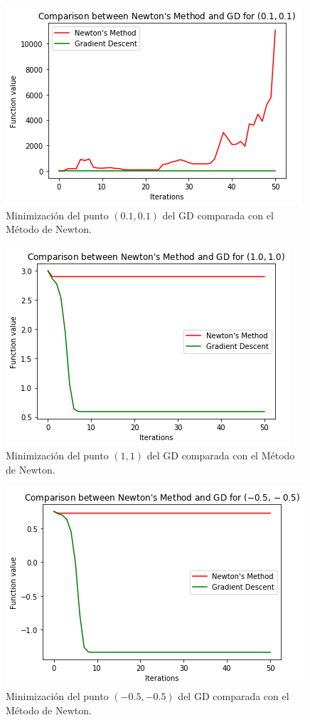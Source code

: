 \documentclass[11pt,a4paper]{article}
\begin{document}
\begin{figure}[H]
\centering
\includegraphics[scale=0.8]{img/nm_cmp1.png}
\caption{Minimización del punto $(0.1, 0.1)$ del GD comparada con el Método de Newton.}
\end{figure}

\begin{figure}[H]
\centering
\includegraphics[scale=0.8]{img/nm_cmp2.png}
\caption{Minimización del punto $(1, 1)$ del GD comparada con el Método de Newton.}
\end{figure}

\begin{figure}[H]
\centering
\includegraphics[scale=0.8]{img/nm_cmp3.png}
\caption{Minimización del punto $(-0.5, -0.5)$ del GD comparada con el Método de Newton.}
\end{figure}
\end{document}
